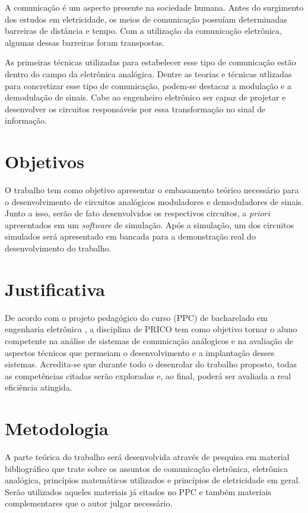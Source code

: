 \documentclass[
	12pt,				%
	oneside,			%
	a4paper,			%
  oldfontcommands,
	english,			%
	french,				%
	spanish,			%
	brazil,				%
	]{abntex2}
\begin{document}
A comunicação é um aspecto presente na sociedade humana. Antes do surgimento dos estudos em eletricidade, os meios de comunicação possuíam determinadas barreiras de distância e tempo. Com a utilização da comunicação eletrônica, algumas dessas barreiras foram transpostas.

As primeiras técnicas utilizadas para estabelecer esse tipo de comunicação estão dentro do campo da eletrônica analógica. Dentre as teorias e técnicas utlizadas para concretizar esse tipo de comunicação, podem-se destacar a modulação e a demodulação de sinais. Cabe ao engenheiro eletrônico ser capaz de projetar e desenvolver os circuitos responsáveis por essa transformação no sinal de informação.

\section{Objetivos}

O trabalho tem como objetivo apresentar o embasamento teórico necessário para o desenvolvimento de circuitos analógicos moduladores e demoduladores de sinais. Junto a isso, serão de fato desenvolvidos os respectivos circuitos, a \emph{priori} apresentados em um \emph{software} de simulação. Após a simulação, um dos circuitos simulados será apresentado em bancada para a demonstração real do desenvolvimento do trabalho.

\section{Justificativa}

De acordo com o projeto pedagógico do curso (PPC) de bacharelado em engenharia eletrônica \cite{ppc}, a disciplina de PRICO tem como objetivo tornar o aluno competente na análise de sistemas de comunicação análogicos e na avaliação de aspectos técnicos que permeiam o desenvolvimento e a implantação desses sistemas. Acredita-se que durante todo o desenrolar do trabalho proposto, todas as competências citadas serão exploradas e, ao final, poderá ser avaliada a real eficiência atingida.

\section{Metodologia}

A parte teórica do trabalho será desenvolvida através de pesquisa em material bibliográfico que trate sobre os assuntos de comunicação eletrônica, eletrônica analógica, princípios matemáticos utilizados e princípios de eletricidade em geral. Serão utilizados aqueles materiais já citados no PPC \cite{ppc} e também materiais complementares que o autor julgar necessário.
\end{document}
